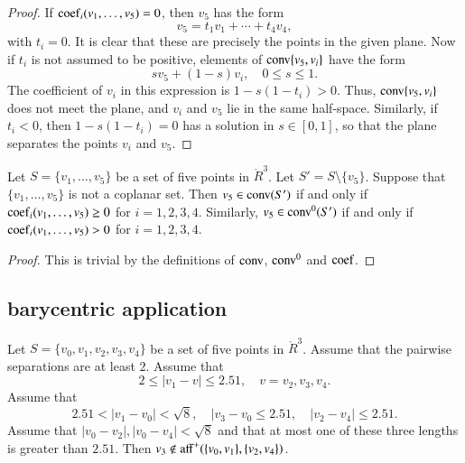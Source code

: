 \begin{proof}
If ${\operatorname{coef}}_i(v_1,\ldots,v_5)=0$, then $v_5$
has the form
	$$
	v_5 = t_1 v_1 + \cdots + t_4 v_4,
	$$
with $t_i=0$.  It is clear that these are
precisely the points in the given plane.
Now if $t_i$ is not assumed to be positive, 
elements of
${\operatorname{conv}}\{v_5,v_i\}$ have the form
	$$s v_5 + (1-s) v_i,\quad 0\le s \le 1.$$
The coefficient of $v_i$ in this expression
is $1-s(1-t_i)>0$.  Thus, ${\operatorname{conv}}\{v_5,v_i\}$
does not meet the plane, and $v_i$ and $v_5$
lie in the same half-space.  Similarly,
if $t_i<0$, then $1-s(1-t_i)=0$ has a solution
in $s\in[0,1]$, so that the plane separates the
points $v_i$ and $v_5$.
\end{proof}
\newpage

\begin{lemma}
Let $S=\{v_1,\ldots,v_5\}$ be
a set of five points in $\ring{R}^3$.  Let $S'=S\setminus\{v_5\}$.
Suppose
that $\{v_1,\ldots,v_5\}$ is not a coplanar
set.  Then $v_5\in{\operatorname{conv}}(S')$ if and only
if  
${\operatorname{coef}}_i(v_1,\ldots,v_5)\ge0$ 
for $i=1,2,3,4$.
Similarly, $v_5\in{\operatorname{conv}}^0(S')$ if and only
if  
${\operatorname{coef}}_i(v_1,\ldots,v_5)>0$ 
for $i=1,2,3,4$.
\end{lemma}

\begin{proof}  This is trivial by the definitions
of ${\operatorname{conv}}$, ${\operatorname{conv}}^0$ and ${\operatorname{coef}}$.
\end{proof}

\newpage







\subsection{barycentric application}

\begin{lemma}
Let $S=\{v_0,v_1,v_2,v_3,v_4\}$ be a set of five points in $\ring{R}^3$.
Assume that the pairwise separations are at least $2$.
Assume that 
  $$2\le |v_1-v|\le 2.51,\quad v = v_2,v_3,v_4.$$
Assume that
  $$2.51 < |v_1-v_0| < \sqrt8,\quad |v_3-v_0\le 2.51,
   \quad |v_2-v_4|\le2.51.$$
Assume that $|v_0-v_2|,|v_0-v_4|<\sqrt8$ and that
at most one of these three lengths is greater than $2.51$.
Then $v_3\not\in{\operatorname{aff}}^+(\{v_0,v_1\},\{v_2,v_4\})$.
\end{lemma}



